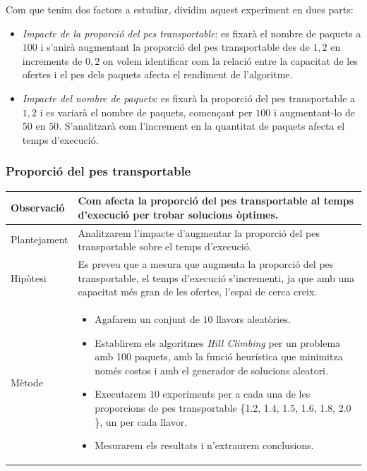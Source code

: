 \documentclass[a4paper]{article}
\begin{document}
	Com que tenim dos factors a estudiar, dividim aquest experiment en dues parts:
	\begin{itemize}
		\item \emph{Impacte de la proporció del pes transportable}: es fixarà el nombre de paquets a $100$ i s'anirà augmentant la proporció del pes transportable des de $1,2$ en increments de $0,2$ on volem identificar com la relació entre la capacitat de les ofertes i el pes dels paquets afecta el rendiment de l'algoritme.

		\item \emph{Impacte del nombre de paquets}: es fixarà la proporció del pes transportable a $1,2$ i es variarà el nombre de paquets, començant per $100$ i augmentant-lo de $50$ en $50$. S'analitzarà com l'increment en la quantitat de paquets afecta el temps d'execució.

	\end{itemize}

	\subsubsection{Proporció del pes transportable}
	\begin{table}[ht]
		\centering
		\begin{tabular}{|l|p{10cm}|}
			\hline
			Observació & Com afecta la proporció del pes transportable al temps d'execució per trobar solucions òptimes.\\
			\hline
			Plantejament & Analitzarem l'impacte d'augmentar la proporció del pes transportable sobre el temps d'execució. \\
			\hline
			Hipòtesi & Es preveu que a mesura que augmenta la proporció del pes transportable, el temps d'execució s'incrementi, ja que amb una capacitat més gran de les ofertes, l'espai de cerca creix.\\
			\hline
			Mètode &
			\begin{itemize}
				\item Agafarem un conjunt de $10$ llavors aleatòries.
				\item Establirem els algoritmes \textit{Hill Climbing} per un problema amb 100 paquets, amb la funció heurística que minimitza només costos i amb el generador de solucions aleatori.
				\item Executarem $10$ experiments per a cada una de les proporcions de pes transportable \{1.2, 1.4, 1.5, 1.6, 1.8, 2.0 \}, un per cada llavor.
				\item Mesurarem els resultats i n'extraurem conclusions.
			\end{itemize} \\
			\hline
		\end{tabular}
		\label{tab:exp4a_apartats}
	\end{table}
\end{document}
